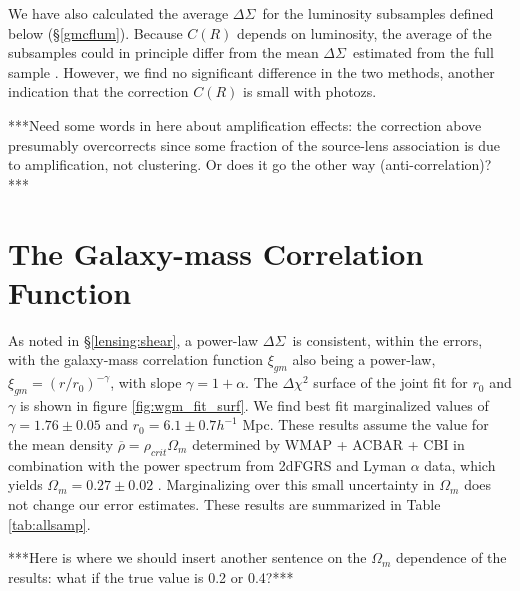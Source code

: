 \documentclass{emulateapj}
\newcommand{\deltasig}{$\Delta \Sigma$}
\begin{document}
We have also calculated the average 
\deltasig\ for the luminosity subsamples defined below (\S \ref{gmcflum}).  
Because $C(R)$ depends on luminosity, the average of the subsamples 
could in principle differ from the mean \deltasig\ estimated from the full sample 
\citep{Guzik02}.  However, we find no significant difference in the
two methods, another indication that the correction $C(R)$ is small with 
photozs.   

***Need some words in here about amplification effects: the correction above 
presumably overcorrects since some fraction of the source-lens association 
is due to amplification, not clustering. Or does it go the other 
way (anti-correlation)?***


\section{The Galaxy-mass Correlation Function} \label{gglmeas:wgm}

As noted in 
\S \ref{lensing:shear}, 
a power-law \deltasig\ is consistent, within the errors, with the 
galaxy-mass correlation function $\xi_{gm}$ also being a power-law, 
$\xi_{gm} = (r/r_0)^{-\gamma}$, with slope $\gamma = 1+\alpha$. 
The $\Delta \chi^2$ surface of the joint fit for $r_0$ and $\gamma$ is shown in
figure \ref{fig:wgm_fit_surf}. We find best fit marginalized values of $\gamma
= 1.76 \pm 0.05$ and $r_0 = 6.1 \pm 0.7 h^{-1}$ Mpc. These results assume the value 
for the mean density $\overline{\rho}=\rho_{crit} \Omega_m$ 
determined by WMAP + ACBAR + CBI in combination 
with the power spectrum from 2dFGRS and Lyman
$\alpha$ data, which yields $\Omega_m = 0.27 \pm 0.02$ \citep{Spergel03}. 
Marginalizing over this small uncertainty in $\Omega_m$ does not change our 
error estimates.
These results are summarized in Table \ref{tab:allsamp}.

***Here is where we should insert another sentence on the $\Omega_m$ 
dependence of the results: what if the true value is 0.2 or 0.4?***
\end{document}
